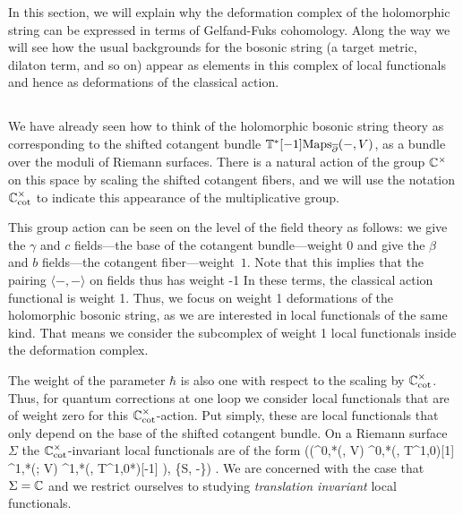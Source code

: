 In this section, we will explain why the deformation complex of the holomorphic string 
can be expressed in terms of Gelfand-Fuks cohomology. 
Along the way we will see how the usual backgrounds for the bosonic string (a target metric, dilaton term, and so on) appear as elements in this complex of local functionals and hence as deformations of the classical action. 

\subsection{}

We have already seen how to think of the holomorphic bosonic string theory 
as corresponding to the shifted cotangent bundle $\mathbb T^*[-1]{\rm Maps}_{\overline{\partial}}(-, V)$, 
as a bundle over the moduli of Riemann surfaces. 
There is a natural action of the group $ \mathbb C^\times$ on this space
by scaling the shifted cotangent fibers,
and we will use the notation $\mathbb C^\times_{\rm cot}$ to indicate this appearance of the multiplicative group.

This group action can be seen on the level of the field theory as follows: 
we give the $\gamma$ and $c$ fields---the base of the cotangent bundle---weight $0$ and give the $\beta$ and $b$ fields---the cotangent fiber---weight~$1$. 
Note that this implies that the pairing $\langle-,-\rangle$ on fields thus has weight -1 
In these terms, the classical action functional is weight 1. 
Thus, we focus on weight 1 deformations of the holomorphic bosonic string,
as we are interested in local functionals of the same kind.
That means we consider the subcomplex of weight 1 local functionals inside the deformation complex.

The weight of the parameter $\hbar$ is also one with respect to the scaling by $\mathbb C^\times_{\rm cot}$.
Thus, for quantum corrections at one loop we consider local functionals that are of weight zero for this $\mathbb C^\times_{\rm cot}$-action.
Put simply, these are local functionals that only depend on the base of the shifted cotangent bundle. 
On a Riemann surface $\Sigma$ the $\mathbb C^\times_{\rm cot}$-invariant local functionals are of the form
\ben
\left(\Oloc\left(\Omega^{0,*}(\Sigma, V) \oplus \Omega^{0,*}(\Sigma, T^{1,0})[1] \Omega^{1,*}(\Sigma ; V) \oplus \Omega^{1,*}(\Sigma, T^{1,0*})[-1] \right), \{S, -\}\right) .
\een
We are concerned with the case that $\Sigma = \mathbb C$ and we restrict ourselves to studying {\em translation invariant} local functionals. 

